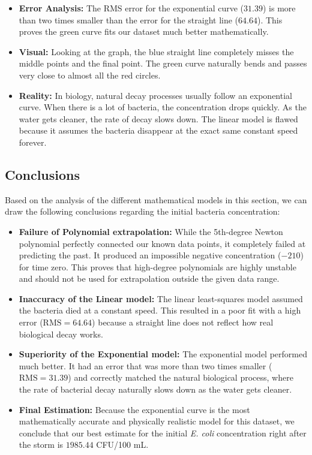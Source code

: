 \documentclass{article}
\begin{document}
\begin{itemize}
    \item \textbf{Error Analysis:} The RMS error for the exponential curve ($31.39$) is more than two times smaller than the error for the straight line ($64.64$). This proves the green curve fits our dataset much better mathematically.
    \item \textbf{Visual:} Looking at the graph, the blue straight line completely misses the middle points and the final point. The green curve naturally bends and passes very close to almost all the red circles.
    \item \textbf{Reality:} In biology, natural decay processes usually follow an exponential curve. When there is a lot of bacteria, the concentration drops quickly. As the water gets cleaner, the rate of decay slows down. The linear model is flawed because it assumes the bacteria disappear at the exact same constant speed forever.
\end{itemize}


\subsection{Conclusions}

Based on the analysis of the different mathematical models in this section, we can draw the following conclusions regarding the initial bacteria concentration:

\begin{itemize}
    \item \textbf{Failure of Polynomial extrapolation:} While the 5th-degree Newton polynomial perfectly connected our known data points, it completely failed at predicting the past. It produced an impossible negative concentration ($-210$) for time zero. This proves that high-degree polynomials are highly unstable and should not be used for extrapolation outside the given data range.

    \item \textbf{Inaccuracy of the Linear model:} The linear least-squares model assumed the bacteria died at a constant speed. This resulted in a poor fit with a high error ($\text{RMS} = 64.64$) because a straight line does not reflect how real biological decay works.

    \item \textbf{Superiority of the Exponential model:} The exponential model performed much better. It had an error that was more than two times smaller ($\text{RMS} = 31.39$) and correctly matched the natural biological process, where the rate of bacterial decay naturally slows down as the water gets cleaner.

    \item \textbf{Final Estimation:} Because the exponential curve is the most mathematically accurate and physically realistic model for this dataset, we conclude that our best estimate for the initial \textit{E. coli} concentration right after the storm is $1985.44$ CFU/100 mL.
\end{itemize}
\end{document}
